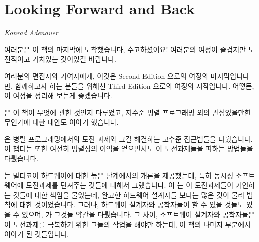
\chapter{Looking Forward and Back}
\label{chp:Looking Forward and Back}
%
	  {\emph{Konrad Adenauer}}

여러분은 이 책의 마지막에 도착했습니다, 수고하셨어요!
여러분의 여정이 즐겁지만 도전적이고 가치있는 것이었길 바랍니다.

여러분의 편집자와 기여자에게, 이것은 Second Edition 으로의 여정의
마지막입니다만, 함께하고자 하는 분들을 위해선 Third Edition 으로의 여정의
시작입니다.
어떻든, 이 여정을 정리해 보는게 좋겠습니다.

 은 이 책이 무엇에 관한 것인지 다루었고, 저수준
병렬 프로그래밍 외의 관심있을만한 무언가에 대한 대안도 이야기 했습니다.

 은 병렬 프로그래밍에서의 도전 과제와 그걸 해결하는
고수준 접근법들을 다뤘습니다.
이 챕터는 또한 여전히 병렬성의 이익을 얻으면서도 이 도전과제들을 피하는
방법들을 다뤘습니다.

 는 멀티코어 하드웨어에 대한 높은 단계에서의
개론을 제공했는데, 특히 동시성 소프트웨어에 도전과제를 던져주는 것들에 대해서
그랬습니다.
이  는 이 도전과제들이 기인하는 것들에
대한 책임을 물었는데, 완고한 하드웨어 설계자들 보다는 많은 것이 물리 법칙에
대한 것이었습니다.
그러나, 하드웨어 설계자와 공학자들이 할 수 있을 것들도 있을 수 있으며,
 가 그것들 약간을 다뤘습니다.
그 사이, 소프트웨어 설계자와 공학자들은 이 도전과제를 극복하기 위한 그들의
작업을 해야만 하는데, 이 책의 나머지 부분에서 이야기 된 것들입니다.

